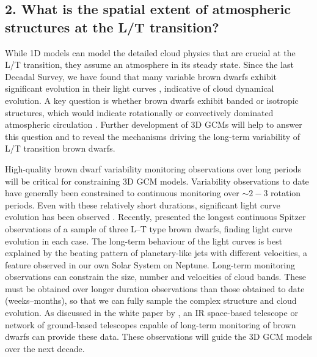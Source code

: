 \documentclass[12pt]{article}
\begin{document}
\begin{justify}
 \subsection*{2. What is the spatial extent of atmospheric structures at the L/T transition?}

 While 1D models can model the detailed cloud physics that are crucial at the L/T transition, they assume an atmosphere in its steady state. Since the last Decadal Survey, we have found that many variable brown dwarfs exhibit significant evolution in their light curves \citep[e.g][]{Karalidi2016, Apai2017a}, indicative of cloud dynamical evolution. A key question is whether brown dwarfs exhibit banded or isotropic structures, which would indicate rotationally or convectively dominated atmospheric circulation \citep{Showman2013}.
Further development of 3D GCMs will help to answer this question and to reveal the mechanisms driving the long-term variability of L/T transition brown dwarfs.\smallskip
 
 
 \noindent High-quality brown dwarf variability monitoring observations over long periods will be critical for constraining 3D GCM models. Variability observations to date have generally been constrained to continuous monitoring over $\sim2-3$ rotation periods. Even with these relatively short durations, significant light curve evolution has been observed \citep{Artigau2009, Yang2016}. Recently, \citep{Apai2017a} presented the longest continuous Spitzer observations of a sample of three L--T type brown dwarfs, finding light curve evolution in each case. The long-term behaviour of the light curves is best explained by the beating pattern of planetary-like jets with different velocities, a feature observed in our own Solar System on Neptune. Long-term monitoring observations can constrain the size, number and velocities of cloud bands. These must be obtained over longer duration observations than those obtained to date (weeks--months), so that we can fully sample the complex structure and  cloud evolution. As discussed in the white paper by \citep{Apai2019}, an IR space-based telescope or network of ground-based telescopes capable of long-term monitoring of brown dwarfs can provide these data. These observations will guide the 3D GCM models over the next decade. \smallskip
 



\end{justify}
\end{document}
